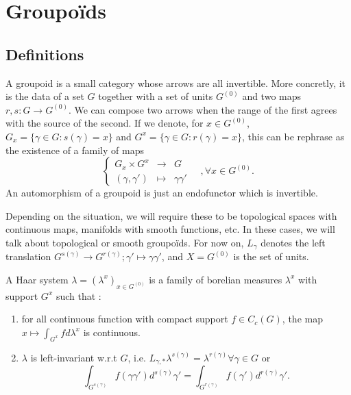 \section{Groupoïds}

\subsection{Definitions}
\begin{definition}
A groupoid is a small category whose arrows are all invertible. More concretly, it is the data of a set $G$ together with a set of units $G^{(0)}$ and two maps $r,s : G \rightarrow G^{(0)}$. We can compose two arrows when the range of the first agrees with the source of the second. If we denote, for $x\in G^{(0)}$,  $G_x=\{\gamma \in G : s(\gamma)=x\}$ and $G^x=\{ \gamma\in G : r(\gamma)=x\}$, this can be rephrase as the existence of a family of maps
\[\left\{\begin{array}{lcr} G_x\times G^x & \rightarrow & G  \\ (\gamma,\gamma') & \mapsto & \gamma\gamma'\end{array}\right.\quad ,\forall x\in G^{(0)}.\]
An automorphism of a groupoid is just an endofunctor which is invertible.
\end{definition}

Depending on the situation, we will require these to be topological spaces with continuous maps, manifolds with smooth functions, etc. In these cases, we will talk about topological or smooth groupoïds. For now on, $L_\gamma$ denotes the left translation $G^{s(\gamma)}\rightarrow G^{r(\gamma)}; \gamma'\mapsto \gamma\gamma'$, and $X=G^{(0)}$ is the set of units.\\

\begin{definition}
A Haar system $\lambda=(\lambda^x)_{x\in G^{(0)}}$ is a family of borelian measures $\lambda^x$ with support $G^x$ such that :
\begin{enumerate}
\item for all continuous function with compact support $f\in C_c(G)$, the map $x\mapsto \int_{G^x} f d\lambda^x$ is continuous.
\item $\lambda$ is left-invariant w.r.t $G$, i.e. $L_{\gamma,*}\lambda^{s(\gamma)}= \lambda^{r(\gamma)}\forall \gamma\in G$ or 
\[\int_{G^{s(\gamma)}} f(\gamma\gamma')d^{s(\gamma)}\gamma' = \int_{G^{r(\gamma)}} f(\gamma')d^{r(\gamma)}\gamma'.\]
\end{enumerate}
\end{definition}

